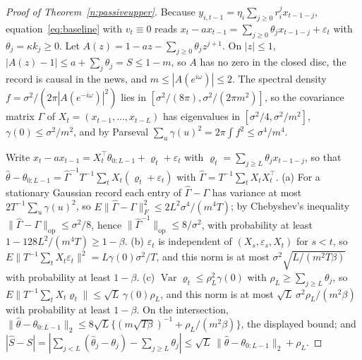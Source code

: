 \documentclass[11pt,letterpaper]{article}
\theoremstyle{definition}
\begin{document}
\begin{proof}[Proof of Theorem~\ref{n:passiveupper}]
Because $y_{i,t-1} = \eta_i \sum_{j \ge 0} r_i^j x_{t-1-j}$, equation~\eqref{eq:baseline} with $v_t \equiv 0$ reads $x_t - a x_{t-1} = \sum_{j \ge 0} \theta_j x_{t-1-j} + \varepsilon_t$ with $\theta_j = \kappa k_j \ge 0$. Let $A(z) = 1 - a z - \sum_{j \ge 0} \theta_j z^{j+1}$. On $|z| \le 1$, $|A(z) - 1| \le a + \sum_j \theta_j = S \le 1 - m$, so $A$ has no zero in the closed disc, the record is causal in the news, and $m \le |A(e^{i\omega})| \le 2$. The spectral density $f = \sigma^2 / (2\pi |A(e^{-i\omega})|^2)$ lies in $[\sigma^2/(8\pi), \sigma^2/(2\pi m^2)]$, so the covariance matrix $\Gamma$ of $X_t = (x_{t-1}, \dots, x_{t-L})$ has eigenvalues in $[\sigma^2/4, \sigma^2/m^2]$, $\gamma(0) \le \sigma^2/m^2$, and by Parseval $\sum_u \gamma(u)^2 = 2\pi \int f^2 \le \sigma^4/m^4$.

Write $x_t - a x_{t-1} = X_t^\top \theta_{0:L-1} + \varrho_t + \varepsilon_t$ with $\varrho_t = \sum_{j \ge L} \theta_j x_{t-1-j}$, so that $\hat\theta - \theta_{0:L-1} = \hat\Gamma^{-1} T^{-1} \sum_t X_t (\varrho_t + \varepsilon_t)$ with $\hat\Gamma = T^{-1} \sum_t X_t X_t^\top$. (a) For a stationary Gaussian record each entry of $\hat\Gamma - \Gamma$ has variance at most $2 T^{-1} \sum_u \gamma(u)^2$, so $E\|\hat\Gamma - \Gamma\|_F^2 \le 2 L^2 \sigma^4 / (m^4 T)$; by Chebyshev's inequality $\|\hat\Gamma - \Gamma\|_{\mathrm{op}} \le \sigma^2/8$, hence $\|\hat\Gamma^{-1}\|_{\mathrm{op}} \le 8/\sigma^2$, with probability at least $1 - 128 L^2/(m^4 T) \ge 1 - \beta$. (b) $\varepsilon_t$ is independent of $(X_s, \varepsilon_s, X_t)$ for $s < t$, so $E\|T^{-1} \sum_t X_t \varepsilon_t\|^2 = L \gamma(0) \sigma^2 / T$, and this norm is at most $\sigma^2 \sqrt{L/(m^2 T \beta)}$ with probability at least $1 - \beta$. (c) $\operatorname{Var} \varrho_t \le \rho_L^2 \gamma(0)$ with $\rho_L \ge \sum_{j \ge L} \theta_j$, so $E\|T^{-1} \sum_t X_t \varrho_t\| \le \sqrt{L}\, \gamma(0) \rho_L$, and this norm is at most $\sqrt{L}\, \sigma^2 \rho_L / (m^2 \beta)$ with probability at least $1 - \beta$. On the intersection, $\|\hat\theta - \theta_{0:L-1}\|_2 \le 8\sqrt{L}\{(m\sqrt{T\beta})^{-1} + \rho_L/(m^2\beta)\}$, the displayed bound; and $|\hat S - S| = |\sum_{j < L} (\hat\theta_j - \theta_j) - \sum_{j \ge L} \theta_j| \le \sqrt{L}\, \|\hat\theta - \theta_{0:L-1}\|_2 + \rho_L$.


\end{proof}
\end{document}
